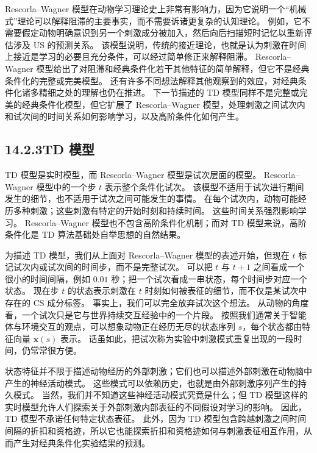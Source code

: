 \documentclass[UTF8,12pt,a4paper,fontset=fandol]{ctexart}
\begin{document}
Rescorla--Wagner 模型在动物学习理论史上非常有影响力，因为它说明一个“机械式”理论可以解释阻滞的主要事实，而不需要诉诸更复杂的认知理论。
例如，它不需要假定动物明确意识到另一个刺激成分被加入，然后向后扫描短时记忆以重新评估涉及 US 的预测关系。
该模型说明，传统的接近理论，也就是认为刺激在时间上接近是学习的必要且充分条件，可以经过简单修正来解释阻滞。
Rescorla--Wagner 模型给出了对阻滞和经典条件化若干其他特征的简单解释，但它不是经典条件化的完整或完美模型。
还有许多不同想法解释其他观察到的效应，对经典条件化诸多精细之处的理解也仍在推进。
下一节描述的 TD 模型同样不是完整或完美的经典条件化模型，但它扩展了 Rescorla--Wagner 模型，处理刺激之间试次内和试次间的时间关系如何影响学习，以及高阶条件化如何产生。

\subsection*{14.2.3\quad TD 模型}

TD 模型是实时模型，而 Rescorla--Wagner 模型是试次层面的模型。
Rescorla--Wagner 模型中的一个步 $t$ 表示整个条件化试次。
该模型不适用于试次进行期间发生的细节，也不适用于试次之间可能发生的事情。
在每个试次内，动物可能经历多种刺激；这些刺激有特定的开始时刻和持续时间。
这些时间关系强烈影响学习。
Rescorla--Wagner 模型也不包含高阶条件化机制；而对 TD 模型来说，高阶条件化是 TD 算法基础处自举思想的自然结果。

为描述 TD 模型，我们从上面对 Rescorla--Wagner 模型的表述开始，但现在 $t$ 标记试次内或试次间的时间步，而不是完整试次。
可以把 $t$ 与 $t+1$ 之间看成一个很小的时间间隔，例如 $0.01$ 秒；把一个试次看成一串状态，每个时间步对应一个状态。
现在步 $t$ 的状态表示刺激在 $t$ 时刻如何被表征的细节，而不仅是某试次中存在的 CS 成分标签。
事实上，我们可以完全放弃试次这个想法。
从动物的角度看，一个试次只是它与世界持续交互经验中的一个片段。
按照我们通常关于智能体与环境交互的观点，可以想象动物正在经历无尽的状态序列 $s$，每个状态都由特征向量 $\mathbf{x}(s)$ 表示。
话虽如此，把试次称为实验中刺激模式重复出现的一段时间，仍常常很方便。

状态特征并不限于描述动物经历的外部刺激；它们也可以描述外部刺激在动物脑中产生的神经活动模式。
这些模式可以依赖历史，也就是由外部刺激序列产生的持久模式。
当然，我们并不知道这些神经活动模式究竟是什么；但 TD 模型这样的实时模型允许人们探索关于外部刺激内部表征的不同假设对学习的影响。
因此，TD 模型不承诺任何特定状态表征。
此外，因为 TD 模型包含跨越刺激之间时间间隔的折扣和资格迹，所以它也能探索折扣和资格迹如何与刺激表征相互作用，从而产生对经典条件化实验结果的预测。
\end{document}
